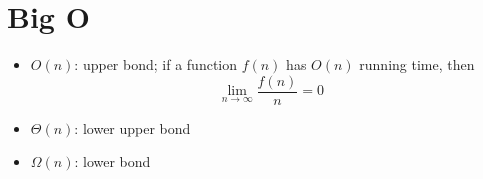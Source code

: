 \chapter{Big O}

\begin{itemize}
  \item $ O\left( n \right) $: upper bond; if a function $ f\left( n \right) $
  has $ O\left( n \right) $ running time, then
  \begin{equation}
    \lim_{n \to \infty} \frac{f\left( n \right)}{n} = 0
  \end{equation}
  \item $ \Theta\left( n \right) $: lower upper bond
  \item $ \Omega\left( n \right) $: lower bond
\end{itemize}
